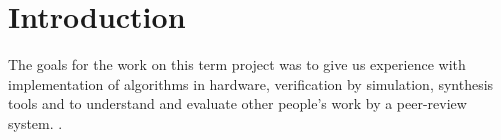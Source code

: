 \chapter{Introduction}
The goals for the work on this term project was to give us experience with implementation of algorithms in hardware, verification by simulation, synthesis tools and to understand and evaluate other people's work by a peer-review system. \cite{ggmanual}.\cite{rsahardware}
